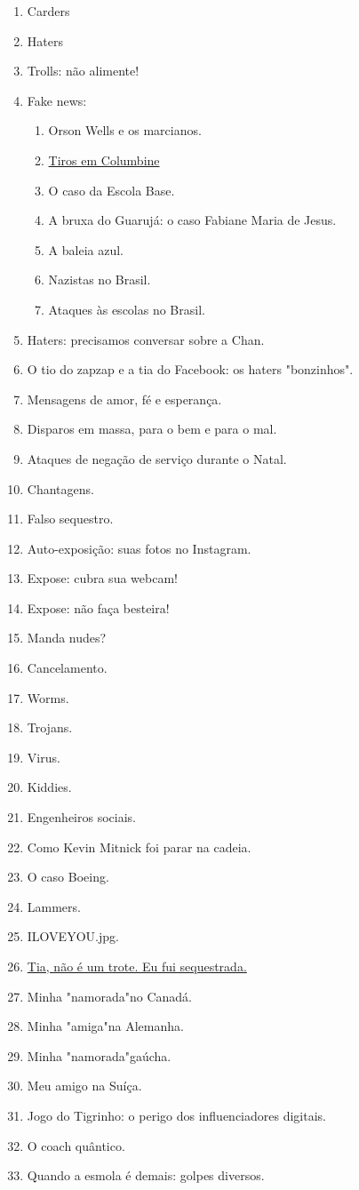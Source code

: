 \begin{enumerate}
	\item Carders
	\item Haters
	\item Trolls: não alimente!
	\item Fake news:
	\begin{enumerate}
		\item Orson Wells e os marcianos.
		\item \href{https://pt.wikipedia.org/wiki/Massacre_de_Columbine}{Tiros em Columbine}
		\item O caso da Escola Base.
		\item A bruxa do Guarujá: o caso Fabiane Maria de Jesus.
		\item A baleia azul.
		\item Nazistas no Brasil.
		\item Ataques às escolas no Brasil.
	\end{enumerate}
	\item Haters: precisamos conversar sobre a Chan.
	\item O tio do zapzap e a tia do Facebook: os haters "bonzinhos".
	\item Mensagens de amor, fé e esperança.
	\item Disparos em massa, para o bem e para o mal.
	\item Ataques de negação de serviço durante o Natal.
	\item Chantagens.
	\item Falso sequestro.
	\item Auto-exposição: suas fotos no Instagram.
	\item Expose: cubra sua webcam!
	\item Expose: não faça besteira!
	\item Manda nudes?
	\item Cancelamento.
	\item Worms.
	\item Trojans.
	\item Virus.
	\item Kiddies.
	\item Engenheiros sociais.
	\item Como Kevin Mitnick foi parar na cadeia.
	\item O caso Boeing.
	\item Lammers.
	\item ILOVEYOU.jpg.
	\item \href{http://g1.globo.com/bom-dia-brasil/noticia/2010/12/menina-de-8-anos-sequestrada-por-prima-escapa-pedindo-ajuda-pelo-celular.html}{Tia, não é um trote. Eu fui sequestrada.}
	\item Minha "namorada"\space no Canadá.
	\item Minha "amiga"\space na Alemanha.
	\item Minha "namorada"\space gaúcha.
	\item Meu amigo na Suíça.
	\item Jogo do Tigrinho: o perigo dos influenciadores digitais.
	\item O coach quântico.
	\item Quando a esmola é demais: golpes diversos.
	

\end{enumerate}
